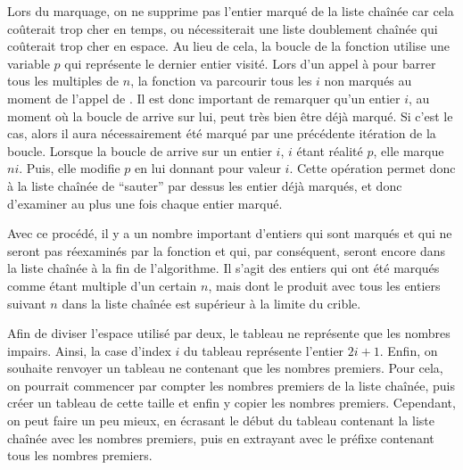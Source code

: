 \documentclass[a4paper]{easychair}
\newcommand\arr[1]{\ocamlf{arr[}#1\ocamlf{]}}
\begin{document}
Lors du marquage, on ne supprime pas l'entier marqué de la liste chaînée car
cela coûterait trop cher en temps, ou nécessiterait une liste doublement
chaînée qui coûterait trop cher en espace.
Au lieu de cela, la boucle de la fonction 
utilise une variable $p$ qui représente le dernier entier visité.
Lors d'un appel à  pour barrer tous les multiples de $n$,
la fonction va parcourir tous les $i$ non marqués au moment de l'appel de
. Il est donc important de remarquer qu'un entier $i$,
au moment où la boucle de  arrive sur lui, peut très bien
être déjà marqué. Si c'est le cas, alors il aura nécessairement été marqué par
une précédente itération de la boucle.
Lorsque la boucle de  arrive sur un entier $i$,
$i$ étant réalité \arr{$p$}, elle marque $ni$.
Puis, elle modifie \arr{$p$} en lui donnant pour valeur \arr{$i$}.
Cette opération permet donc à la liste chaînée de ``sauter'' par dessus
les entier déjà marqués, et donc d'examiner au plus une fois chaque entier marqué.

Avec ce procédé, il y a un nombre important d'entiers qui sont marqués et qui ne
seront pas réexaminés par la fonction  et qui,
par conséquent, seront encore dans la liste chaînée à la fin de l'algorithme.
Il s'agit des entiers qui ont été marqués comme étant multiple d'un certain $n$,
mais dont le produit avec tous les entiers suivant $n$ dans la liste chaînée est
supérieur à la limite du crible.

Afin de diviser l'espace utilisé par deux, le tableau  ne représente que les nombres
impairs. Ainsi, la case d'index $i$ du tableau représente l'entier $2i + 1$.
Enfin, on souhaite renvoyer un tableau ne contenant que les nombres premiers.
Pour cela, on pourrait commencer par compter les nombres premiers
de la liste chaînée, puis créer un tableau de cette taille et enfin y copier
les nombres premiers.
Cependant, on peut faire un peu mieux, en écrasant le début du tableau
contenant la liste chaînée avec les nombres premiers, puis en
extrayant avec  le préfixe contenant tous les nombres premiers.
\end{document}
